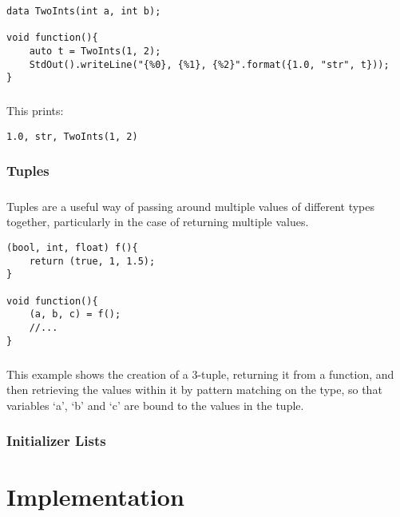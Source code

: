 \documentclass[12pt,twoside,notitlepage]{report}
\begin{document}
\begin{lstlisting}
data TwoInts(int a, int b);

void function(){
	auto t = TwoInts(1, 2);
	StdOut().writeLine("{%0}, {%1}, {%2}".format({1.0, "str", t}));
}
\end{lstlisting}

\paragraph{}
This prints:

\begin{verbatim}
1.0, str, TwoInts(1, 2)
\end{verbatim}

\subsection{Tuples}

\paragraph{}
Tuples are a useful way of passing around multiple values of different types together, particularly in the case of returning multiple values.

\begin{lstlisting}
(bool, int, float) f(){
	return (true, 1, 1.5);
}

void function(){
	(a, b, c) = f();
	//...
}
\end{lstlisting}

\paragraph{}
This example shows the creation of a 3-tuple, returning it from a function, and then retrieving the values within it by pattern matching on the type, so that variables `a', `b' and `c' are bound to the values in the tuple.

\subsection{Initializer Lists}

\paragraph{}


\cleardoublepage

\chapter{Implementation}
\end{document}
